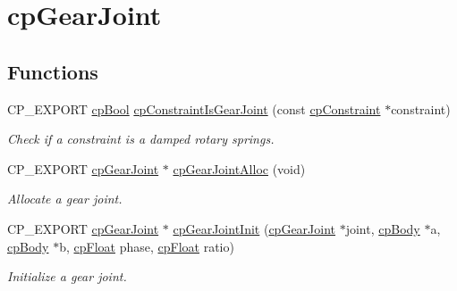 \hypertarget{group__cp_gear_joint}{}\section{cp\+Gear\+Joint}
\label{group__cp_gear_joint}
\subsection*{Functions}
\begin{DoxyCompactItemize}
\item 
\mbox{\label{group__cp_gear_joint_gac129589a0c7775d8ca30f0448bed620a}} 
C\+P\+\_\+\+E\+X\+P\+O\+RT \mbox{\hyperlink{group__basic_types_gabc5e752c48f3449ca26ef413ecbd647e}{cp\+Bool}} \mbox{\hyperlink{group__cp_gear_joint_gac129589a0c7775d8ca30f0448bed620a}{cp\+Constraint\+Is\+Gear\+Joint}} (const \mbox{\hyperlink{structcp_constraint}{cp\+Constraint}} $\ast$constraint)
\begin{DoxyCompactList}\small\item\em Check if a constraint is a damped rotary springs. \end{DoxyCompactList}\item 
\mbox{\label{group__cp_gear_joint_gaba050c787dab1ba2379e469009f67dba}} 
C\+P\+\_\+\+E\+X\+P\+O\+RT \mbox{\hyperlink{structcp_gear_joint}{cp\+Gear\+Joint}} $\ast$ \mbox{\hyperlink{group__cp_gear_joint_gaba050c787dab1ba2379e469009f67dba}{cp\+Gear\+Joint\+Alloc}} (void)
\begin{DoxyCompactList}\small\item\em Allocate a gear joint. \end{DoxyCompactList}\item 
\mbox{\label{group__cp_gear_joint_ga27b1889e75aa8e34576836d0f4cfcf5f}} 
C\+P\+\_\+\+E\+X\+P\+O\+RT \mbox{\hyperlink{structcp_gear_joint}{cp\+Gear\+Joint}} $\ast$ \mbox{\hyperlink{group__cp_gear_joint_ga27b1889e75aa8e34576836d0f4cfcf5f}{cp\+Gear\+Joint\+Init}} (\mbox{\hyperlink{structcp_gear_joint}{cp\+Gear\+Joint}} $\ast$joint, \mbox{\hyperlink{structcp_body}{cp\+Body}} $\ast$a, \mbox{\hyperlink{structcp_body}{cp\+Body}} $\ast$b, \mbox{\hyperlink{group__basic_types_gac1ed65573e035bf892505768c852d8d3}{cp\+Float}} phase, \mbox{\hyperlink{group__basic_types_gac1ed65573e035bf892505768c852d8d3}{cp\+Float}} ratio)
\begin{DoxyCompactList}\small\item\em Initialize a gear joint. \end{DoxyCompactList}\item 

\end{DoxyCompactItemize}

